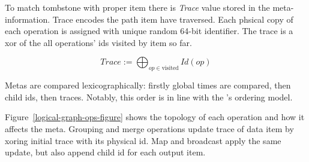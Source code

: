 To match tombstone with proper item there is {\it Trace} value stored in the meta-information. Trace encodes the path item have traversed. Each phsical copy of each operation is assigned with unique random 64-bit identifier. The trace is a xor of the all operations' ids visited by item so far.

\[Trace := \bigoplus_{op \in \text{visited}} Id(op)\]

Metas are compared lexicographically: firstly global times are compared, then child ids, then traces. Notably, this order is in line with the \FlameStream's ordering model.

Figure~\ref{logical-graph-ops-figure} shows the topology of each operation and how it affects the meta. Grouping and merge operations update trace of data item by xoring initial trace with its physical id. Map and broadcast apply the same update, but also append child id for each output item.

